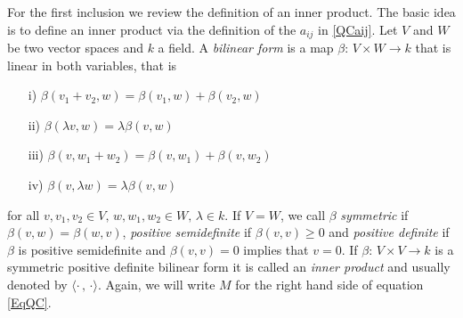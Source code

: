 For the first inclusion we review the definition of an inner product. The basic idea is to define an inner product via the  definition of the $ a_{ij} $ in \ref{QCaij}.
Let $ V $ and $ W $ be two vector spaces and $ k  $ a field. A {\itshape bilinear form} is a map $ \beta: \, V \times W \to k $ that is linear in both variables, that is 
\begin{enumerate}
	\item [i)] $\beta(v_1+v_2,w) = \beta(v_1,w) + \beta(v_2,w)  $
	\item  [ii)]$\beta(\lambda v,w)= \lambda \beta(v,w) $
	\item [iii)]$ \beta(v,w_1+w_2) = \beta(v,w_1)+ \beta(v,w_2) $
	\item [iv)]$ \beta(v,\lambda w) = \lambda\beta(v,w) $
\end{enumerate}
for all $ v,v_1,v_2 \in V, \, w,w_1,w_2 \in W, \, \lambda \in k $. 
If $ V = W $, we call $ \beta $ {\itshape symmetric} if $ \beta(v,w) = \beta(w,v) $, {\itshape positive semidefinite} if 
$ \beta(v,v) \ge 0 $ and {\itshape positive definite} if $ \beta $ is positive semidefinite and $ \beta(v,v)= 0 $ implies that $ v = 0 $. 
If $ \beta: \, V \times V \to k $ is a symmetric positive definite bilinear form it is called an {\itshape inner product} and usually denoted by $ \langle \cdot \, , \, \cdot \rangle $.
Again, we will write $ M $ for the right hand side of equation \ref{EqQC}.

